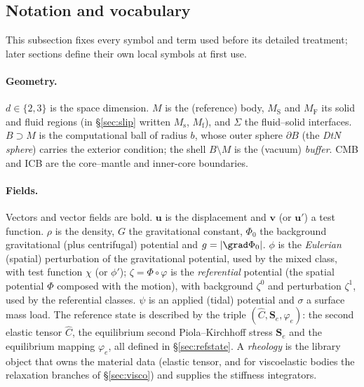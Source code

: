 \documentclass[11pt]{article}
\numberwithin{equation}{section}
\theoremstyle{remark}
\newcommand{\vu}{\mathbf{u}}
\newcommand{\vv}{\mathbf{v}}
\newcommand{\Ch}{\hat{C}}
\newcommand{\Se}{\mathbf{S}_e}
\newcommand{\MS}{M_{\mathrm{S}}}
\newcommand{\MF}{M_{\mathrm{F}}}
\begin{document}
\subsection{Notation and vocabulary}
\label{sec:notation}

This subsection fixes every symbol and term used before its detailed
treatment; later sections define their own local symbols at first use.

\paragraph{Geometry.} $d\in\{2,3\}$ is the space dimension. $M$ is the
(reference) body, $\MS$ and $\MF$ its solid and fluid regions (in
\S\ref{sec:slip} written $M_{\mathrm{s}}$, $M_{\mathrm{f}}$), and
$\Sigma$ the fluid--solid interfaces. $B\supset M$ is the computational
ball of radius $b$, whose outer sphere $\partial B$ (the \emph{DtN
sphere}) carries the exterior condition; the shell $B\setminus M$ is the
(vacuum) \emph{buffer}. CMB and ICB are the core--mantle and inner-core
boundaries.

\paragraph{Fields.} Vectors and vector fields are bold. $\vu$ is the
displacement and $\vv$ (or $\vu'$) a test function. $\rho$ is the
density, $G$ the gravitational constant, $\Phi_0$ the background
gravitational (plus centrifugal) potential and $g = |\grad\Phi_0|$.
$\phi$ is the \emph{Eulerian} (spatial) perturbation of the gravitational
potential, used by the mixed class, with test function $\chi$ (or
$\phi'$); $\zeta = \Phi\circ\varphi$ is the \emph{referential} potential
(the spatial potential $\Phi$ composed with the motion), with background
$\zeta^0$ and perturbation $\zeta^1$, used by the referential classes.
$\psi$ is an applied (tidal) potential and $\sigma$ a surface mass load.
The reference state is described by the triple $(\Ch,\Se,\varphi_e)$:
the second elastic tensor $\Ch$, the equilibrium second Piola--Kirchhoff
stress $\Se$ and the equilibrium mapping $\varphi_e$, all defined in
\S\ref{sec:refstate}. A \emph{rheology} is the library object that owns the
material data (elastic tensor, and for viscoelastic bodies the relaxation
branches of \S\ref{sec:visco}) and supplies the stiffness integrators.
\end{document}
